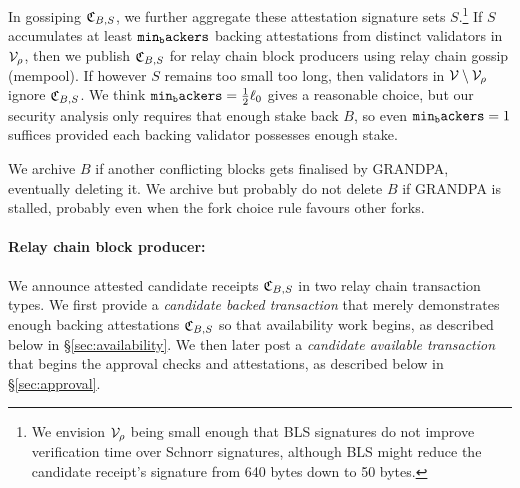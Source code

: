 In gossiping $\mathfrak{C}_{B,S}$, we further aggregate these attestation signature sets $S$.\footnote{We envision $\mathcal{V}_{\rho}$ being small enough that BLS signatures do not improve verification time over Schnorr signatures, although BLS might reduce the candidate receipt's signature from 640 bytes down to 50 bytes.}  
If $S$ accumulates at least $\mathtt{min_backers}$ backing attestations from distinct validators in $\mathcal{V}_\rho$, then we publish $\mathfrak{C}_{B,S}$ for relay chain block producers using relay chain gossip (mempool).
If however $S$ remains too small too long, then validators in $\mathcal{V} \setminus \mathcal{V}_\rho$ ignore $\mathfrak{C}_{B,S}$.
We think $\mathtt{min_backers} = {1\over2} \ell_0$ gives a reasonable choice, but our security analysis only requires that enough stake back $B$, so even $\mathtt{min_backers} = 1$ suffices provided each backing validator possesses enough stake.

We archive $B$ if another conflicting blocks gets finalised by GRANDPA, eventually deleting it.  We archive but probably do not delete $B$ if GRANDPA is stalled, probably even when the fork choice rule favours other forks. 

\smallskip
\paragraph{Relay chain block producer:}

We announce attested candidate receipts $\mathfrak{C}_{B,S}$ in two relay chain transaction types.  We first provide a {\em candidate backed transaction} that merely demonstrates enough backing attestations $\mathfrak{C}_{B,S}$ so that availability work begins, as described below in \S\ref{sec:availability}.  We then later post a {\em candidate available transaction} that begins the approval checks and attestations, as described below in \S\ref{sec:approval}.

\smallskip

